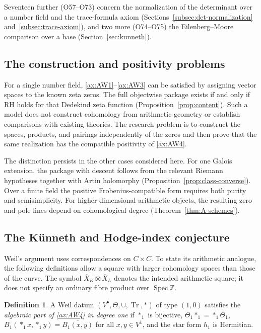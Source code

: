 \documentclass[11pt]{amsart}
\theoremstyle{plain}
\theoremstyle{definition}
\newtheorem{definition}[theorem]{Definition}
\theoremstyle{remark}
\numberwithin{equation}{section}
\newcommand{\Z}{\mathbb{Z}}
\newcommand{\Xbar}{\overline{X}}
\DeclareMathOperator{\Tr}{Tr}
\DeclareMathOperator{\Spec}{Spec}
\begin{document}
Seventeen further
 (O57--O73) concern the
normalization of the determinant over a number field and the
trace-formula axiom (Sections~\ref{subsec:det-normalization}
and~\ref{subsec:trace-axiom}), and two more (O74--O75) the
Eilenberg--Moore comparison over a base
(Section~\ref{sec:kunneth}).

\subsection{The construction and positivity problems}

For a single number field, \ref{ax:AW1}--\ref{ax:AW3} can be
satisfied by assigning vector spaces to the known zeta zeros.
The full objectwise package exists if and only if RH holds for that
Dedekind zeta function (Proposition~\ref{prop:content}). Such a model
does not construct cohomology from arithmetic geometry or establish
comparisons with existing theories. The research problem is to
construct the spaces, products, and pairings independently of the zeros
and then prove that the same realization has the compatible positivity
of \ref{ax:AW4}.

The distinction persists in the other cases considered here. For one
Galois extension, the package with descent follows from the relevant
Riemann hypotheses together with Artin holomorphy
(Proposition~\ref{prop:class-converse}). Over a finite field the positive
Frobenius-compatible form requires both purity and semisimplicity.
For higher-dimensional arithmetic objects, the resulting zero and pole
lines depend on cohomological degree
(Theorem~\ref{thm:A-schemes}).
\subsection{The K\"unneth and Hodge-index conjecture}
\label{subsec:intro-kunneth}

Weil's argument uses correspondences on $C\times C$. To state its
arithmetic analogue, the following definitions allow a square with
larger cohomology spaces than those of the curve. The symbol
$\Xbar_K\boxtimes\Xbar_L$ denotes the intended arithmetic square;
it does not specify an ordinary fibre product over $\Spec\Z$.

\begin{definition}\label{def:aw4-alg}
A Weil datum $(V^\bullet,\Theta,\cup,\Tr,*)$ of type $(1,0)$ satisfies
the \emph{algebraic part of \ref{ax:AW4} in degree one} if $*_1$ is
bijective, $\Theta_1*_1=*_1\Theta_1$,
$B_1(*_1x,*_1y)=\overline{B_1(x,y)}$ for all $x,y\in V^1$, and the star
form $h_1$ is Hermitian.
\end{definition}
\end{document}
